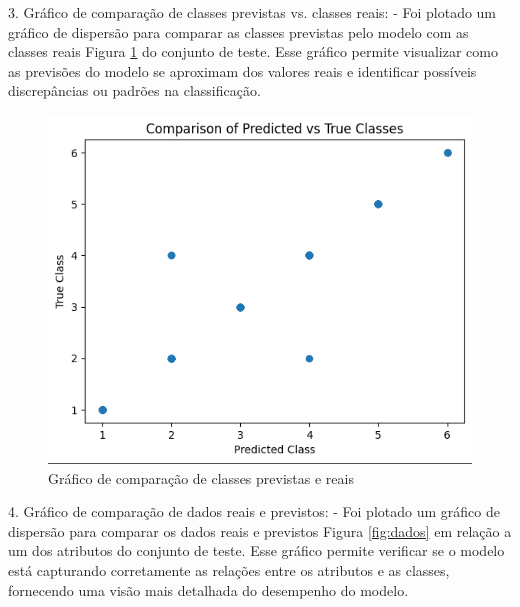 \documentclass[conference]{IEEEtran}
\begin{document}
3. Gráfico de comparação de classes previstas vs. classes reais:
   - Foi plotado um gráfico de dispersão para comparar as classes previstas pelo modelo com as classes reais Figura \ref{fig:classes} do conjunto de teste. Esse gráfico permite visualizar como as previsões do modelo se aproximam dos valores reais e identificar possíveis discrepâncias ou padrões na classificação.

\begin{figure}[htbp]
    \centerline{\includegraphics[width = 1.0\linewidth]{./figuras/figura4.png}}
    \caption{Gráfico de comparação de classes previstas e reais}
    \label{fig:classes}
\end{figure}

4. Gráfico de comparação de dados reais e previstos:
   - Foi plotado um gráfico de dispersão para comparar os dados reais e previstos Figura \ref{fig:dados} em relação a um dos atributos do conjunto de teste. Esse gráfico permite verificar se o modelo está capturando corretamente as relações entre os atributos e as classes, fornecendo uma visão mais detalhada do desempenho do modelo.
\end{document}

